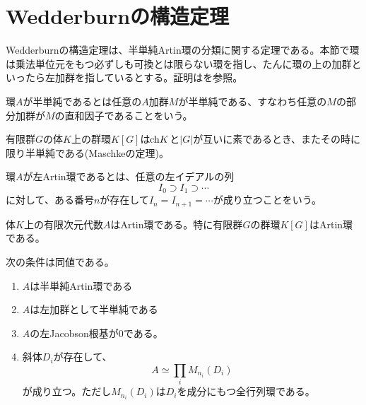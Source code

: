 \documentclass{ltjsreport}
\begin{document}
\chapter{Wedderburnの構造定理}

Wedderburnの構造定理は、半単純Artin環の分類に関する定理である。本節で環は乗法単位元をもつ必ずしも可換とは限らない環を指し、たんに環の上の加群といったら左加群を指しているとする。証明は\cite{alg_intro}を参照。

\begin{defin}
  環$A$が半単純であるとは任意の$A$加群$M$が半単純である、すなわち任意の$M$の部分加群が$M$の直和因子であることをいう。
\end{defin}

\begin{eg}
  有限群$G$の体$K$上の群環$K[G]$は$\text{ch} K$と$|G|$が互いに素であるとき、またその時に限り半単純である(Maschkeの定理)。
\end{eg}

\begin{defin}
  環$A$が左Artin環であるとは、任意の左イデアルの列
  \[
  I_0\supset I_1\supset \cdots  
  \]
  に対して、ある番号$n$が存在して$I_n=I_{n+1}=\cdots$が成り立つことをいう。
\end{defin}

\begin{eg}
  体$K$上の有限次元代数$A$はArtin環である。特に有限群$G$の群環$K[G]$はArtin環である。
\end{eg}

\begin{theo}[Wedderburnの構造定理]
  次の条件は同値である。
  \begin{enumerate}
    \item $A$は半単純Artin環である
    \item $A$は左加群として半単純である
    \item $A$の左Jacobson根基が0である。
    \item 斜体$D_i$が存在して、
    \[
    A\simeq \prod_iM_{n_i}(D_i)  
    \]
    が成り立つ。ただし$M_{n_i}(D_i)$は$D_i$を成分にもつ全行列環である。
  \end{enumerate}
\end{theo}
\end{document}
